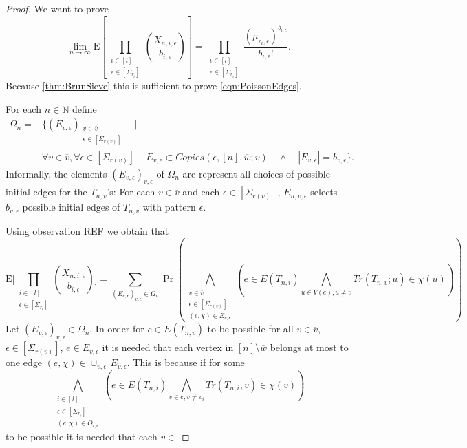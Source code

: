 \documentclass[12pt,notitlepage,a4paper]{article}
\theoremstyle{definition}
\newcommand{\N}{\mathbb{N}}
\newcommand{\Ln}{\lim\limits_{n\to \infty}}
\begin{document}
\begin{proof}
		We want to prove
		\[
		\Ln \mathrm{E}\left[\prod_{\substack{i\in [l]\\ \epsilon \in [\Sigma_{r_i}]}} \binom{X_{n,i,\epsilon}}{b_{i,\epsilon}}
		\right]= \prod_{\substack{i\in [l]\\ \epsilon \in [\Sigma_{r_i}]}}
		\frac{(\mu_{r_i,\epsilon})^{b_{i,\epsilon}}}{b_{i,\epsilon}!}.
		\]
		Because \cref{thm:BrunSieve} this is sufficient to prove \cref{eqn:PoissonEdges}. \par
		For each $n\in \N$ define
		\begin{align*}
		\Omega_n=&\Bigg\{
		(E_{v,\epsilon})_{\substack{v\in \overline{v}\\ \epsilon
		\in [\Sigma_{r(v)}]}} \quad \Big|\\ 
		&  \forall v\in \overline{v},
		\forall \epsilon \in [\Sigma_{r(v)}]\, \quad  E_{v,\epsilon}\subset
		Copies(\epsilon,[n],\overline{w};v)\quad  \wedge \quad |E_{v,\epsilon}|=b_{v,\epsilon}\Bigg\}.
		\end{align*}
		Informally, the elements $(E_{v,\epsilon})_{v,\epsilon}$
		of $\Omega_n$ are represent all choices of
		possible initial edges for the $T_{n,v}$'s: For each $v\in \overline{v}$
		and each $\epsilon\in [\Sigma_{r(v)}]$, $E_{n,v,\epsilon}$ selects
		$b_{v,\epsilon}$ possible initial edges of $T_{n,v}$
		with pattern $\epsilon$.\par
		Using observation REF we obtain that
		\[
		\mathrm{E}\Big[\prod_{\substack{i\in [l]\\ \epsilon \in [\Sigma_{r_i}]}} \binom{X_{n,i,\epsilon}}{b_{i,\epsilon}}
		\Big]= \sum_{(E_{v,\epsilon})_{v,\epsilon} \in \Omega_n
		}		
		\Pr \left( \bigwedge_{\substack{v\in \overline{v} \\ \epsilon \in
		[\Sigma_{r(v)}]\\ (e,\chi) \in E_{v,\epsilon} }} \left( e\in E(T_{n,i}) 
		\bigwedge_{u\in V(e), u\neq v} Tr(T_{n,v};u)\in \chi(u)
		\right)  \right)
		\]
		Let $(E_{v,\epsilon})_{v,\epsilon}\in \Omega_n$. 
		In order for $e\in E(T_{n,v})$ to be possible for all
		$v\in \overline{v}$, $\epsilon\in [\Sigma_{r(v)}]$, 
		$e\in E_{v,\epsilon}$ it is needed that each vertex 
		in $[n]\setminus \overline{w}$ belongs at most to one
		edge $(e,\chi)\in \cup_{v,\epsilon} \, E_{v,\epsilon}$.
		This is because if for some 
		\[
		\bigwedge_{\substack{i\in [l]\\ \epsilon \in
		[\Sigma_{r_i}]\\ (e,\chi) \in O_{i,\epsilon} }} \left( e\in E(T_{n,i}) 
		\bigwedge_{v\in e, v\neq v_i} Tr(T_{n,i},v)\in \chi(v)
		\right) 
		\] 
		to be possible it is needed that each $v\in $
	\end{proof}
	
\end{document}
